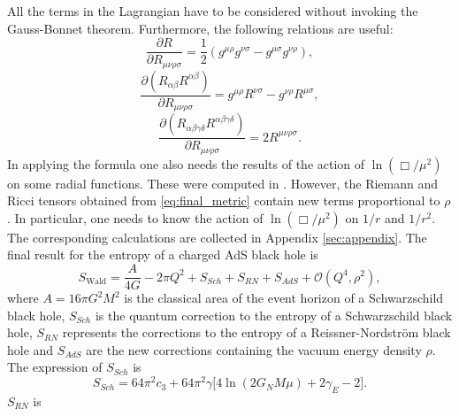 \documentclass[10pt,a4paper]{article}
\begin{document}
All the terms in the Lagrangian have to be considered without invoking the Gauss-Bonnet theorem. Furthermore, the following relations are useful:
\begin{equation}
    \frac{\partial R}{\partial R_{\mu\nu\rho\sigma}}=\frac{1}{2}\left(g^{\mu\rho}g^{\nu\sigma}-g^{\mu\sigma}g^{\nu\rho}\right),
\end{equation}
\begin{equation}
    \frac{\partial\left(R_{\alpha\beta}R^{\alpha\beta}\right)}{\partial R_{\mu\nu\rho\sigma}}=g^{\mu\rho}R^{\nu\sigma}-g^{\nu\rho}R^{\mu\sigma},
\end{equation}
\begin{equation}
    \frac{\partial\left(R_{\alpha\beta\gamma\delta}R^{\alpha\beta\gamma\delta}\right)}{\partial R_{\mu\nu\rho\sigma}}=2R^{\mu\nu\rho\sigma}.
\end{equation}
In applying the formula one also needs the results of the action of  $\ln\left(\Box/\mu^2\right)$ on some radial functions. These were computed in \cite{Delgado:2022pcc}. However, the Riemann and Ricci tensors obtained from \eqref{eq:final_metric} contain new terms proportional to $\rho$.  In particular, one needs to know the action of  $\ln\left(\Box/\mu^2\right)$ on $1/r$ and $1/r^2$. The corresponding calculations are collected in Appendix \ref{sec:appendix}.
The final result for the entropy of a charged AdS black hole is
\begin{equation}\label{eq:corrected_entropy}
    S_{\text{Wald}}=\frac{A}{4G}-2\pi Q^2+S_{Sch}+S_{RN}+S_{AdS}+\mathcal{O}\left(Q^4,\rho^2\right),
\end{equation}
where $A=16\pi G^2M^2$ is the classical area of the event horizon of a Schwarzschild black
hole, $S_{Sch}$ is the quantum correction to the entropy of a Schwarzschild black hole, $S_{RN}$ represents the corrections to the entropy of a Reissner-Nordstr\"om black hole and $S_{AdS}$ are the new corrections containing the vacuum energy density $\rho$. The expression of $S_{Sch}$ is \cite{Delgado:2022pcc, Calmet:2021lny}
\begin{equation}
    S_{Sch}=64\pi^2c_3+64\pi^2\gamma\Big[4\ln\left(2G_NM\mu\right)+2\gamma_E-2\Big].
\end{equation}
$S_{RN}$ is \cite{Delgado:2022pcc}
\end{document}
